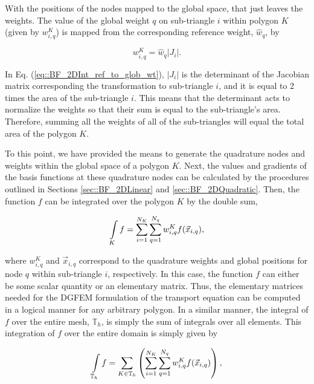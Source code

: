 With the positions of the nodes mapped to the global space, that just leaves the weights. The value of the global weight $q$ on sub-triangle $i$ within polygon $K$ (given by $w_{i,q}^K$) is mapped from the corresponding reference weight, $\hat{w}_q$, by

\begin{equation}
\label{eq::BF_2DInt_ref_to_glob_wt}
w_{i,q}^K =   \hat{w}_q | J_i | .
\end{equation}

\noindent In Eq. (\ref{eq::BF_2DInt_ref_to_glob_wt}), $| J_i |$ is the determinant of the Jacobian matrix corresponding the transformation to sub-triangle $i$, and it is equal to 2 times the area of the sub-triangle $i$. This means that the determinant acts to normalize the weights so that their sum is equal to the sub-triangle's area. Therefore, summing all the weights of all of the sub-triangles will equal the total area of the polygon $K$.

To this point, we have provided the means to generate the quadrature nodes and weights within the global space of a polygon $K$. Next, the values and gradients of the basis functions at these quadrature nodes can be calculated by the procedures outlined in Sections \ref{sec::BF_2DLinear} and \ref{sec::BF_2DQuadratic}. Then, the function $f$ can be integrated over the polygon $K$ by the double sum,

\begin{equation}
\label{eq::BF_2DIntegration_cellK}
\int\displaylimits_{K} f = \sum_{i=1}^{N_K} \sum_{q=1}^{N_q} w_{i,q}^K f (\vec{x}_{i,q}) ,
\end{equation}

\noindent where $w_{i,q}^K$ and $\vec{x}_{i,q}$ correspond to the quadrature weights and global positions for node $q$ within sub-triangle $i$, respectively. In this case, the function $f$ can either be some scalar quantity or an elementary matrix. Thus, the elementary matrices needed for the DGFEM formulation of the transport equation can be computed in a logical manner for any arbitrary polygon. In a similar manner, the integral of $f$ over the entire mesh, $\mathbb{T}_h$, is simply the sum of integrals over all elements. This integration of $f$ over the entire domain is simply given by

\begin{equation}
\label{eq::BF_2DIntegration_domain}
\int\displaylimits_{\mathbb{T}_h} f = \sum_{K \in \mathbb{T}_h} \left( \sum_{i=1}^{N_K} \sum_{q=1}^{N_q} w_{i,q}^K f (\vec{x}_{i,q}) \right) ,
\end{equation}

